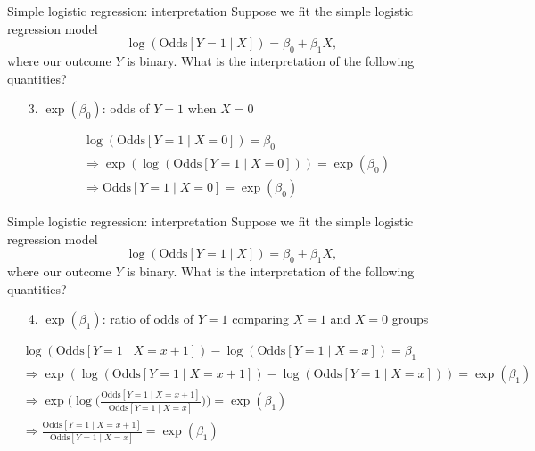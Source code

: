 \documentclass[10pt,t]{beamer}
\begin{document}
\begin{frame}{Simple logistic regression: interpretation}
	Suppose we fit the simple logistic regression model $$\log\left(\text{Odds}[Y =1 \mid X]\right) = \beta_0 + \beta_1 X,$$ where our outcome $Y$ is binary. What is the interpretation of the following quantities?
	\begin{enumerate}
		\item[3.] $\exp(\beta_0)$: odds of $Y = 1$ when $X = 0$
	\end{enumerate} 
	\begin{align*}
	&\log\left(\text{Odds}[Y =1 \mid X = 0]\right) = \beta_0\\
	&\Rightarrow \exp(\log(\text{Odds}[Y =1 \mid X = 0])) = \exp(\beta_0)\\
	&\Rightarrow \text{Odds}[Y =1 \mid X = 0] = \exp(\beta_0)
	\end{align*}
\end{frame}

\begin{frame}{Simple logistic regression: interpretation}
	Suppose we fit the simple logistic regression model $$\log\left(\text{Odds}[Y =1 \mid X]\right) = \beta_0 + \beta_1 X,$$ where our outcome $Y$ is binary. What is the interpretation of the following quantities?
	\begin{enumerate}
		\item[4.] $\exp(\beta_1)$: ratio of odds of $Y = 1$ comparing $X = 1$ and $X = 0$ groups
	\end{enumerate} 
\begin{footnotesize}
	\begin{align*}
		&\log\left(\text{Odds}[Y =1 \mid X = x + 1]\right) - \log\left(\text{Odds}[Y =1 \mid X = x ]\right) = \beta_1\\
		&\Rightarrow \exp(\log\left(\text{Odds}[Y =1 \mid X = x + 1]\right) - \log\left(\text{Odds}[Y =1 \mid X = x ]\right)) = \exp(\beta_1)\\
		&\Rightarrow \exp\biggr(\log\biggr(\frac{\text{Odds}[Y =1 \mid X = x + 1]}{\text{Odds}[Y =1 \mid X = x ]}\biggr)\biggr) = \exp(\beta_1)\\
		&\Rightarrow \frac{\text{Odds}[Y =1 \mid X = x + 1]}{\text{Odds}[Y =1 \mid X = x ]} = \exp(\beta_1)
	\end{align*}
\end{footnotesize}
\end{frame}
\end{document}
